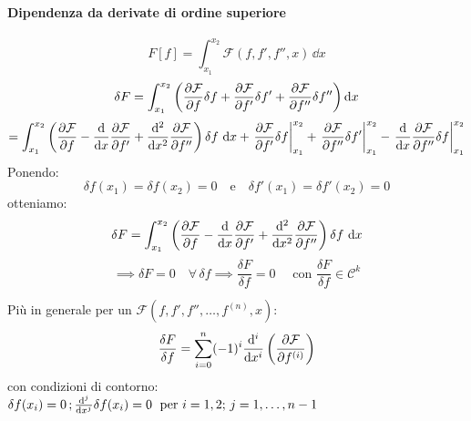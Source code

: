 \paragraph{Dipendenza da derivate di ordine superiore}
\begin{equation}
    F[f] = \int_{x_1}^{x_2} \mathcal{F}(f, f', f'', x)\, \dd{x}
\end{equation}
\begin{equation*}
    \delta F = \int_{x_1}^{x_2} \left( \pdv{\mathcal{F}}{f} \delta f + \pdv{\mathcal{F}}{f'} \delta f' + \pdv{\mathcal{F}}{f''} \delta f'' \right)\dd{x}
\end{equation*}
\begin{equation*}
    = \int_{x_1}^{x_2} \left( \pdv{\mathcal{F}}{f} - \dv{x} \pdv{\mathcal{F}}{f'} + \dv[2]{x} \pdv{\mathcal{F}}{f''} \right) \delta f \, \dd{x}
    + \eval{\pdv{\mathcal{F}}{f'} \delta f}_{x_1}^{x_2}
    + \eval{\pdv{\mathcal{F}}{f''} \delta f'}_{x_1}^{x_2}
    - \eval{\dv{x} \pdv{\mathcal{F}}{f''} \delta f}_{x_1}^{x_2}
\end{equation*}
Ponendo: 
\[
\delta f(x_1) = \delta f(x_2) = 0 \quad \text{e} \quad \delta f'(x_1) = \delta f'(x_2) = 0
\]
otteniamo:
\begin{equation}
\delta F = \int_{x_1}^{x_2} 
\left( \pdv{\mathcal{F}}{f} - \dv{x} \pdv{\mathcal{F}}{f'} + \dv[2]{x} \pdv{\mathcal{F}}{f''} \right) \delta f \, \dd{x}
\end{equation}
\begin{equation}
\implies \delta F = 0 \quad \forall \, \delta f \implies \frac{\delta F}{\delta f} = 0 \quad \text{ con } \frac{\delta F}{\delta f} \in \mathcal{C}^k
\end{equation}

Più in generale per un $\mathcal{F}(f,f',f'',\dots,f^{(n)},x)$:
\begin{equation}
    \frac{\delta F}{\delta f}= \sum_{i=0}^{n}(-1)^i \dv[i ]{}{x}\left( \pdv{\mathcal{F}}{{f^{(i)}}} \right)
\end{equation}
con condizioni di contorno: $\delta f(x_i )= 0\,; \dv[j]{}{x}\delta f(x_i )= 0 \; \text{ per } i = 1,2;\, j = 1,\dots,n-1$\\

